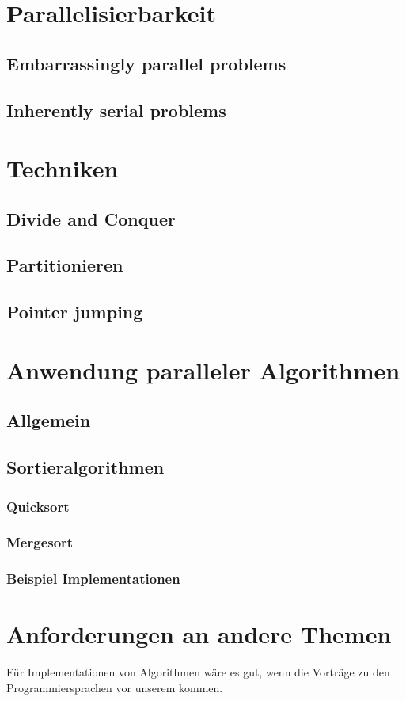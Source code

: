 \section{Parallelisierbarkeit}
\subsection{Embarrassingly parallel problems}
\subsection{Inherently serial problems}
\section{Techniken}
\subsection{Divide and Conquer}
\subsection{Partitionieren}
\subsection{Pointer jumping}
\section{Anwendung paralleler Algorithmen}
\subsection{Allgemein}
\subsection{Sortieralgorithmen}
\subsubsection{Quicksort}
\subsubsection{Mergesort}
\subsubsection{Beispiel Implementationen}

\pagebreak
\nocite{*}
\printbibliography
\pagebreak
\section*{Anforderungen an andere Themen}
Für Implementationen von Algorithmen wäre es gut, wenn die Vorträge zu den Programmiersprachen vor unserem kommen.

